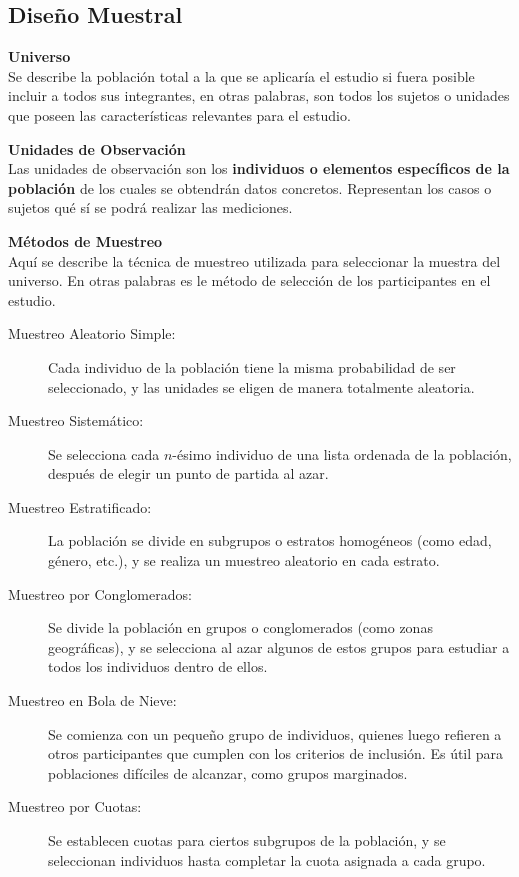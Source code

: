 \documentclass[12pt,letterpaper,spanish, twoside]{article}
\begin{document}
\subsection{Diseño Muestral}
\textbf{Universo}\\
Se describe la población total a la que se aplicaría el estudio si fuera posible incluir a todos sus integrantes, en otras palabras, son todos los sujetos o unidades que poseen las características relevantes para el estudio.

\textbf{Unidades de Observación} \\
Las unidades de observación son los \textbf{individuos o elementos específicos de la población} de los cuales se obtendrán datos concretos. Representan los casos o sujetos qué sí se podrá realizar las mediciones.

\textbf{Métodos de Muestreo} \\
Aquí se describe la técnica de muestreo utilizada para seleccionar la muestra del universo. En otras palabras es le método de selección de los participantes en el estudio.

\begin{description}
    \item[Muestreo Aleatorio Simple:] Cada individuo de la población tiene la misma probabilidad de ser seleccionado, y las unidades se eligen de manera totalmente aleatoria. 

    \item[Muestreo Sistemático:] Se selecciona cada $n$-ésimo individuo de una lista ordenada de la población, después de elegir un punto de partida al azar.

    \item[Muestreo Estratificado:] La población se divide en subgrupos o estratos homogéneos (como edad, género, etc.), y se realiza un muestreo aleatorio en cada estrato. 

    \item[Muestreo por Conglomerados:] Se divide la población en grupos o conglomerados (como zonas geográficas), y se selecciona al azar algunos de estos grupos para estudiar a todos los individuos dentro de ellos. 

    \item[Muestreo en Bola de Nieve:] Se comienza con un pequeño grupo de individuos, quienes luego refieren a otros participantes que cumplen con los criterios de inclusión. Es útil para poblaciones difíciles de alcanzar, como grupos marginados.

    \item[Muestreo por Cuotas:] Se establecen cuotas para ciertos subgrupos de la población, y se seleccionan individuos hasta completar la cuota asignada a cada grupo.
\end{description}
\end{document}
